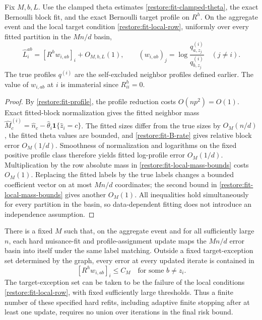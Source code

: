 \begin{proposition}
\label{restore:fit-uniform-score}
\label{restore:fit-score}
Fix $M,b,L$. Use the clamped theta estimates
\eqref{restore:fit-clamped-theta}, the exact Bernoulli block fit, and
the exact Bernoulli target profile on $R^h$.
On the aggregate event and the local target condition
\eqref{restore:fit-local-row}, uniformly over every fitted partition
in the $Mn/d$ basin,
\begin{equation}\label{restore:fit-true-score}
 \widehat L_i^{ab}
       =[R^h w_{i,ab}]_i+O_{M,b,L}(1),\qquad
 (w_{i,ab})_j=
     \log\frac{q_{a,z_j}^{(i)}}{q_{b,z_j}^{(i)}}\quad(j\ne i).
\end{equation}
The true profiles $q^{(i)}$ are the self-excluded neighbor profiles
defined earlier. The value of $w_{i,ab}$ at $i$ is immaterial since
$R^h_{ii}=0$.
\end{proposition}

\begin{proof}
By \cref{restore:fit-profile}, the profile reduction costs
$O(np^2)=O(1)$. Exact fitted-block normalization gives the fitted
neighbor mass
$\widehat M_c^{(i)}
 =\widehat n_c-\widehat\theta_i\mathbf1\{\widehat z_i=c\}$.
The fitted sizes differ from the true sizes by $O_M(n/d)$,
the fitted theta values are bounded, and
\eqref{restore:fit-B-rate} gives relative block error $O_M(1/d)$.
Smoothness of normalization and logarithms on the fixed positive
profile class therefore yields fitted log-profile error $O_M(1/d)$.
Multiplication by the row absolute mass in
\eqref{restore:fit-local-mass-bounds} costs $O_M(1)$.
Replacing the fitted labels by the true labels changes a bounded
coefficient vector on at most $Mn/d$ coordinates; the second bound
in \eqref{restore:fit-local-mass-bounds} gives another $O_M(1)$.
All inequalities hold simultaneously for every partition in the basin,
so data-dependent fitting does not introduce an independence assumption.
\end{proof}

\begin{lemma}
\label{restore:fit-invariant-basin}
\label{restore:fit-invariant}
There is a fixed $M$ such that, on the aggregate event and for all
sufficiently large $n$, each hard nuisance-fit and profile-assignment
update maps the $Mn/d$ error basin into itself under the same label
matching. Outside a fixed target-exception set determined by the graph,
every error at every updated iterate is contained in
\[
 [R^h w_{i,ab}]_i\le C_M
 \quad\text{for some }b\ne z_i.
\]
The target-exception set can be taken to be the failure of the local
conditions \eqref{restore:fit-local-row}, with fixed sufficiently large
thresholds. Thus a finite number of these specified hard refits, including
adaptive finite stopping after at least one update, requires no union
over iterations in the final risk bound.
\end{lemma}

